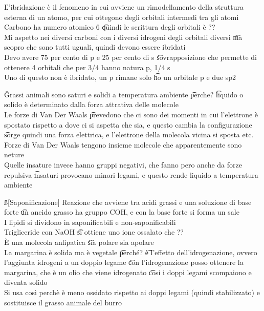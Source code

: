 \documentclass[12pt]{article}
\begin{document}
\v

L'ibridazione è il fenomeno in cui avviene un rimodellamento della struttura esterna di un atomo, per cui ottegono degli orbitali intermedi tra gli atomi \\
Carbono ha numero atomico 6 \t quindi le scrittura degli orbitali è ?? \\
Mi aspetto nei diversi carboni con i diversi idrogeni degli orbitali diversi \t ma scopro che sono tutti uguali, quindi devono essere ibridati \\
Devo avere 75 per cento di p e 25 per cento di s \t sovrapposizione che permette di ottenere 4 orbitali che per 3/4 hanno natura p, 1/4 s \\
Uno di questo non è ibridato, un p rimane solo \t ho un orbitale p e due sp2

\v

Grassi animali sono saturi e solidi a temperatura ambiente \t perche? \t liquido o solido è determinato dalla forza attrativa delle molecole \\
Le forze di Van Der Waals \t prevedono che ci sono dei momenti in cui l'elettrone è spostato rispetto a dove ci si aspetta che sia, e questo cambia la configurazione \t sorge quindi una forza elettrica, e l'elettrone della molecola vicina si sposta etc. \\
Forze di Van Der Waals tengono insieme molecole che apparentemente sono neture \\
Quelle insature invece hanno gruppi negativi, che fanno pero anche da forze repulsiva \t insaturi provocano minori legami, e questo rende liquido a temperatura ambiente

\v

\ss[Saponificazione]
Reazione che avviene tra acidi grassi e una soluzione di base forte \t un ancido grasso ha gruppo COH, e con la base forte si forma un sale \\
I lipidi si dividono in saponificabili e non-saponificabili \\
Trigliceride con NaOH \t si ottiene uno ione ossalato che ?? \\
È una molecola anfipatica \t sia polare sia apolare \\
La margarina è solida ma è vegetale \t perché? \t è l'effetto dell'idrogenazione, ovvero l'aggiunta idrogeni a un doppio legame \t con l'idrogenazione posso ottenere la margarina, che è un olio che viene idrogenato \t cosi i doppi legami scompaiono e diventa solido \\
Si usa così perchè è meno ossidato rispetto ai doppi legami (quindi stabilizzato) e sostituisce il grasso animale del burro
\end{document}
